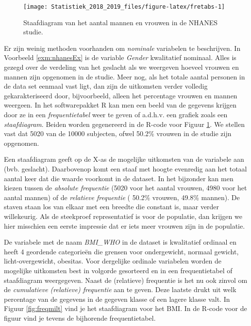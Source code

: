 \documentclass[12pt,dutch,coursenotes]{book}
\theoremstyle{definition}
\theoremstyle{definition}
\theoremstyle{definition}
\theoremstyle{remark}
\begin{document}
\begin{figure}

{\centering \texttt{[image: Statistiek\_2018\_2019\_files/figure-latex/fretabs-1]} 

}

\caption{Staafdiagram van het aantal mannen en vrouwen in de NHANES studie.}\label{fig:fretabs}
\end{figure}

Er zijn weinig methoden voorhanden om \emph{nominale} variabelen te
beschrijven. In Voorbeeld \ref{exm:nhanesEx} is de variable
\emph{Gender} kwalitatief nominaal. Alles is gezegd over de verdeling
van het geslacht als we weergeven hoeveel vrouwen en mannen zijn
opgenomen in de studie. Meer nog, als het totale aantal personen in de
data set eenmaal vast ligt, dan zijn de uitkomsten verder volledig
gekarakteriseerd door, bijvoorbeeld, alleen het percentage vrouwen en
mannen weergeen. In het softwarepakket R kan men een beeld van de
gegevens krijgen door ze in een \emph{frequentietabel} weer te geven of
a.d.h.v. een grafiek zoals een \emph{staafdiagram}. Beiden worden
gegenereerd in de R-code voor Figuur \ref{fig:fretabs}. We stellen vast
dat 5020 van de 10000 subjecten, ofwel 50.2\% vrouwen in de studie zijn
opgenomen.

Een staafdiagram geeft op de X-as de mogelijke uitkomsten van de
variabele aan (bvb. geslacht). Daarbovenop komt een staaf met hoogte
evenredig aan het totaal aantal keer dat die waarde voorkomt in de
dataset. In het bijzonder kan men kiezen tussen de \emph{absolute
frequentie} (5020 voor het aantal vrouwen, 4980 voor het aantal mannen)
of de \emph{relatieve frequentie} ( 50.2\% vrouwen, 49.8\% mannen). De
staven staan los van elkaar met een breedte die constant is, maar verder
willekeurig. Als de steekproef representatief is voor de populatie, dan
krijgen we hier misschien een eerste impressie dat er iets meer vrouwen
zijn in de populatie.

De variabele met de naam \emph{BMI\_WHO} in de dataset is kwalitatief
ordinaal en heeft 4 geordende categorieën die grensen voor ondergewicht,
normaal gewicht, licht-overgewicht, obesitas. Voor dergelijke ordinale
variabelen worden de mogelijke uitkomsten best in volgorde gesorteerd en
in een frequentietabel of staafdiagram weergegeven. Naast de (relatieve)
frequentie is het nu ook zinvol om de \emph{cumulatieve (relatieve)
frequentie} aan te geven. Deze laatste drukt uit welk percentage van de
gegevens in de gegeven klasse of een lagere klasse valt. In Figuur
\ref{fig:freqmilt} vind je het staafdiagram voor het BMI. In de R-code
voor de figuur vind je tevens de bijhorende frequentietabel.
\end{document}
